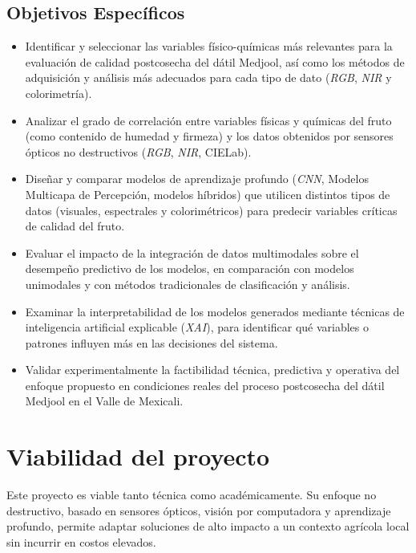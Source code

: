 \subsection{Objetivos Específicos}

\begin{itemize}
    \item Identificar y seleccionar las variables físico-químicas más relevantes para la evaluación de calidad postcosecha del dátil Medjool, así como los métodos de adquisición y análisis más adecuados para cada tipo de dato (\textit{RGB}, \textit{NIR} y colorimetría).
    \item Analizar el grado de correlación entre variables físicas y químicas del fruto (como contenido de humedad y firmeza) y los datos obtenidos por sensores ópticos no destructivos (\textit{RGB}, \textit{NIR}, CIELab).
    \item Diseñar y comparar modelos de aprendizaje profundo (\textit{CNN}, Modelos Multicapa de Percepción, modelos híbridos) que utilicen distintos tipos de datos (visuales, espectrales y colorimétricos) para predecir variables críticas de calidad del fruto.
    \item Evaluar el impacto de la integración de datos multimodales sobre el desempeño predictivo de los modelos, en comparación con modelos unimodales y con métodos tradicionales de clasificación y análisis.
    \item Examinar la interpretabilidad de los modelos generados mediante técnicas de inteligencia artificial explicable (\textit{XAI}), para identificar qué variables o patrones influyen más en las decisiones del sistema.
    \item Validar experimentalmente la factibilidad técnica, predictiva y operativa del enfoque propuesto en condiciones reales del proceso postcosecha del dátil Medjool en el Valle de Mexicali.
\end{itemize}


\section{Viabilidad del proyecto}

Este proyecto es viable tanto técnica como académicamente. Su enfoque no destructivo, basado en sensores ópticos, visión por computadora y aprendizaje profundo, permite adaptar soluciones de alto impacto a un contexto agrícola local sin incurrir en costos elevados.\\


